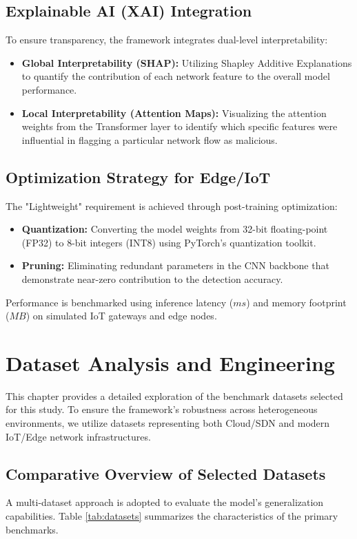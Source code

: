 \documentclass[12pt, a4paper]{report}
\begin{document}
\section{Explainable AI (XAI) Integration}
To ensure transparency, the framework integrates dual-level interpretability:
\begin{itemize}
    \item \textbf{Global Interpretability (SHAP):} Utilizing Shapley Additive Explanations to quantify the contribution of each network feature to the overall model performance.
    \item \textbf{Local Interpretability (Attention Maps):} Visualizing the attention weights from the Transformer layer to identify which specific features were influential in flagging a particular network flow as malicious.
\end{itemize}

\section{Optimization Strategy for Edge/IoT}
The "Lightweight" requirement is achieved through post-training optimization:
\begin{itemize}
    \item \textbf{Quantization:} Converting the model weights from 32-bit floating-point (FP32) to 8-bit integers (INT8) using PyTorch's quantization toolkit.
    \item \textbf{Pruning:} Eliminating redundant parameters in the CNN backbone that demonstrate near-zero contribution to the detection accuracy.
\end{itemize}
Performance is benchmarked using inference latency ($ms$) and memory footprint ($MB$) on simulated IoT gateways and edge nodes.


\chapter{Dataset Analysis and Engineering}
This chapter provides a detailed exploration of the benchmark datasets selected for this study. To ensure the framework's robustness across heterogeneous environments, we utilize datasets representing both Cloud/SDN and modern IoT/Edge network infrastructures.

\section{Comparative Overview of Selected Datasets}
A multi-dataset approach is adopted to evaluate the model's generalization capabilities. Table \ref{tab:datasets} summarizes the characteristics of the primary benchmarks.
\end{document}
